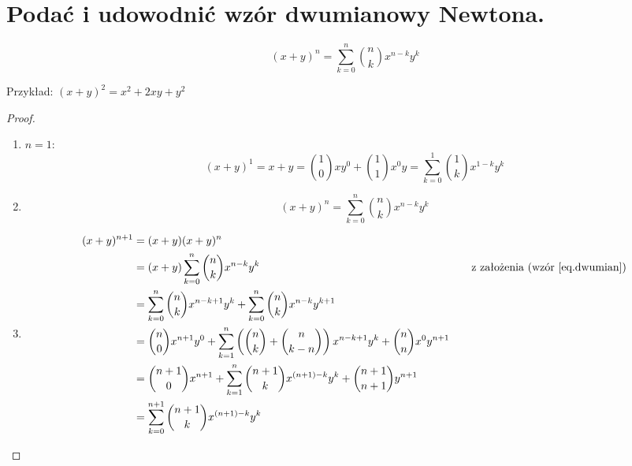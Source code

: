\documentclass{article}
\numberwithin{equation}{section}
\theoremstyle{definition}
\theoremstyle{case}
\begin{document}
\section{Podać i udowodnić wzór dwumianowy Newtona.}
\begin{multicols}{2}
	\begin{equation*}
		(x+y)^n = \sum_{k=0}^n \binom{n}{k} x^{n-k}y^k
	\end{equation*}
	\vspace*{\fill}

	Przykład: $(x+y)^2=x^2+2xy+y^2$
\end{multicols}
\begin{proof}
	\begin{enumerate}
		\item
			$n=1$:
			\begin{equation*}
				(x+y)^1=x+y=\binom{1}{0}xy^0+\binom{1}{1}x^0y=\sum_{k=0}^1\binom{1}{k}x^{1-k}y^k
			\end{equation*}
		\item
			\begin{equation}
				\label{eq.dwumian}
				(x+y)^n=\sum_{k=0}^n\binom{n}{k}x^{n-k}y^k
			\end{equation}
		\item
			\begin{align*}
				(x+y)^{n+1} &=
				(x+y)(x+y)^n
				\\ &= (x+y)\sum_{k=0}^n\binom{n}{k}x^{n-k}y^k &\textnormal{\quad z założenia (wzór \ref{eq.dwumian})}
				\\ &= \sum_{k=0}^n\binom{n}{k}x^{n-k+1}y^k + \sum_{k=0}^n\binom{n}{k}x^{n-k}y^{k+1}
				\\ &= \binom{n}{0}x^{n+1}y^0
				+ \sum_{k=1}^n \left(\binom{n}{k}+\binom{n}{k-n}\right)x^{n-k+1}y^k
				+ \binom{n}{n}x^0y^{n+1}
				\\ &= \binom{n+1}{0}x^{n+1}
				+ \sum_{k=1}^n\binom{n+1}{k}x^{(n+1)-k}y^k
				+ \binom{n+1}{n+1}y^{n+1}
				\\ &= \sum_{k=0}^{n+1}\binom{n+1}{k}x^{(n+1)-k}y^k
			\end{align*}
	\end{enumerate}
\end{proof}
\end{document}
